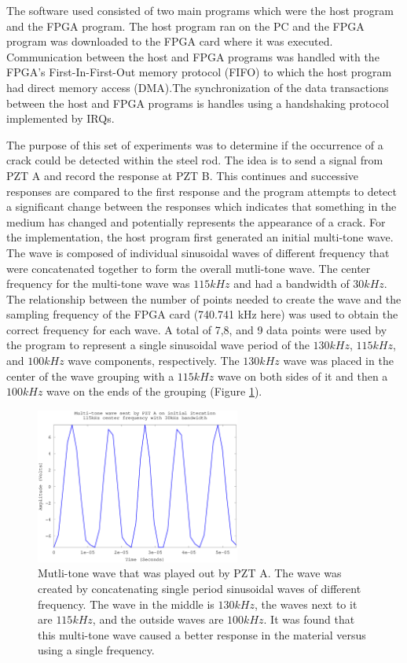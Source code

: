 The software used consisted of two main programs which were the host program and the FPGA program. The host program ran on the PC and the FPGA program was downloaded to the FPGA card where it was executed. Communication between the host and FPGA programs was handled with the FPGA's First-In-First-Out memory protocol (FIFO) to which the host program had direct memory access (DMA).The synchronization of the data transactions between the host and FPGA programs is handles using a handshaking protocol implemented by IRQs. 

The purpose of this set of experiments was to determine if the occurrence of a crack could be detected within the steel rod. The idea is to send a signal from PZT A and record the response at PZT B. This continues and successive responses are compared to the first response and the program attempts to detect a significant change between the responses which indicates that something in the medium has changed and potentially represents the appearance of a crack. For the implementation, the host program first generated an initial multi-tone wave. The wave is composed of individual sinusoidal waves of different frequency that were concatenated together to form the overall mutli-tone wave. The center frequency for the multi-tone wave was $115 kHz$ and had a bandwidth of $30 kHz$. The relationship between the number of points needed to create the wave and the sampling frequency of the FPGA card (740.741 kHz here) was used to obtain the correct frequency for each wave. A total of 7,8, and 9 data points were used by the program to represent a single sinusoidal wave period of the $130 kHz$, $115 kHz$, and $100 kHz$ wave components, respectively. The $130kHz$ wave was placed in the center of the wave grouping with a $115kHz$ wave on both sides of it and then a $100 kHz$ wave on the ends of the grouping (Figure \ref{fig:initialWave}). 

\begin{figure}[ht!]
\centering
\includegraphics[width=0.6\textwidth]{eps_pics/initialWave}
\caption{Mutli-tone wave that was played out by PZT A. The wave was created by concatenating single period sinusoidal waves of different frequency. The wave in the middle is $130kHz$, the waves next to it are $115kHz$, and the outside waves are $100kHz$. It was found that this multi-tone wave caused a better response in the material versus using a single frequency.
 	 \label{fig:initialWave}} 
\end{figure}

